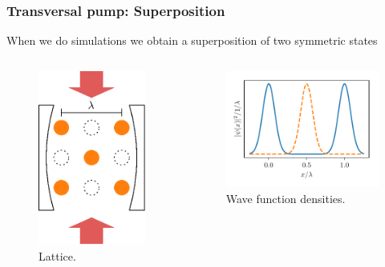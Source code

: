 \documentclass[pdflatex,compress]{beamer}
\begin{document}
\begin{frame}
\frametitle{Transversal pump: Superposition}
When we do simulations we obtain a superposition of two symmetric states
\begin{columns}
\vspace*{-4mm}
\begin{figure}
\centering
\includegraphics[width=.5\textwidth]{images/lattice_drawing_orange.eps}
\vspace*{-2mm}
\caption{Lattice.}
\end{figure}
\begin{figure}
\centering
\includegraphics[width=1\textwidth]{images/density_superposition.pdf}
\vspace*{-10mm}
\caption{Wave function densities.}
\end{figure}
\end{columns}
\end{frame}
\end{document}
